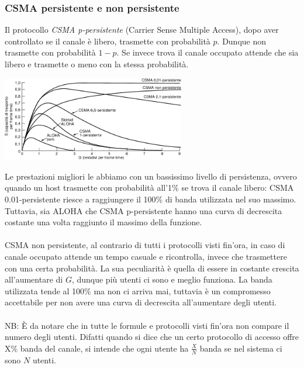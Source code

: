 \documentclass[10pt,a4paper,twoside]{article}
\begin{document}
\subsubsection{CSMA persistente e non persistente}
Il protocollo \textit{CSMA p-persistente} (Carrier Sense Multiple Access), dopo aver controllato se il canale è libero, trasmette con probabilità $p$. Dunque non trasmette con probabilità $1-p$. Se invece trova il canale occupato attende che sia libero e trasmette o meno con la stessa probabilità.
\begin{center}
\includegraphics[width=0.6\textwidth]{images/csma.png}
\end{center}
Le prestazioni migliori le abbiamo con un bassissimo livello di persistenza, ovvero quando un host trasmette con probabilità all'1\% se trova il canale libero: CSMA 0.01-persistente riesce a raggiungere il 100\% di banda utilizzata nel suo massimo.\\
Tuttavia, sia ALOHA che CSMA p-persistente hanno una curva di decrescita costante una volta raggiunto il massimo della funzione.\\\\
CSMA non persistente, al contrario di tutti i protocolli visti fin'ora, in caso di canale occupato attende un tempo casuale e ricontrolla, invece che trasmettere con una certa probabilità. La sua peculiarità è quella di essere in costante crescita all'aumentare di $G$, dunque più utenti ci sono e meglio funziona. La banda utilizzata tende al 100\% ma non ci arriva mai, tuttavia è un compromesso accettabile per non avere una curva di decrescita all'aumentare degli utenti.\\\\
NB: È da notare che in tutte le formule e protocolli visti fin'ora non compare il numero degli utenti. Difatti quando si dice che un certo protocollo di accesso offre X\% banda del canale, si intende che ogni utente ha $\frac{X}{N}$ banda se nel sistema ci sono $N$ utenti.
\end{document}
